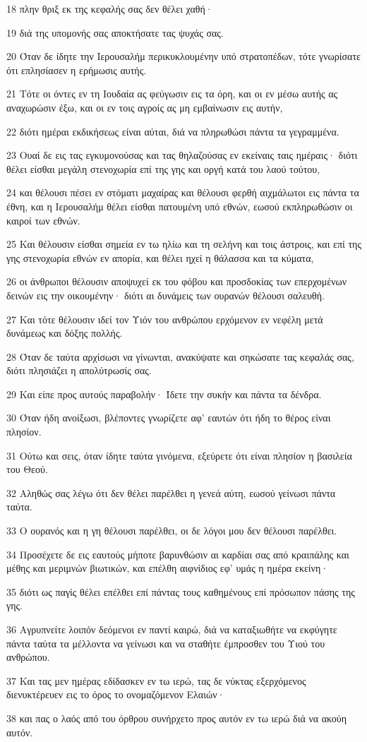 \par 18 πλην θριξ εκ της κεφαλής σας δεν θέλει χαθή·
\par 19 διά της υπομονής σας αποκτήσατε τας ψυχάς σας.
\par 20 Όταν δε ίδητε την Ιερουσαλήμ περικυκλουμένην υπό στρατοπέδων, τότε γνωρίσατε ότι επλησίασεν η ερήμωσις αυτής.
\par 21 Τότε οι όντες εν τη Ιουδαία ας φεύγωσιν εις τα όρη, και οι εν μέσω αυτής ας αναχωρώσιν έξω, και οι εν τοις αγροίς ας μη εμβαίνωσιν εις αυτήν,
\par 22 διότι ημέραι εκδικήσεως είναι αύται, διά να πληρωθώσι πάντα τα γεγραμμένα.
\par 23 Ουαί δε εις τας εγκυμονούσας και τας θηλαζούσας εν εκείναις ταις ημέραις· διότι θέλει είσθαι μεγάλη στενοχωρία επί της γης και οργή κατά του λαού τούτου,
\par 24 και θέλουσι πέσει εν στόματι μαχαίρας και θέλουσι φερθή αιχμάλωτοι εις πάντα τα έθνη, και η Ιερουσαλήμ θέλει είσθαι πατουμένη υπό εθνών, εωσού εκπληρωθώσιν οι καιροί των εθνών.
\par 25 Και θέλουσιν είσθαι σημεία εν τω ηλίω και τη σελήνη και τοις άστροις, και επί της γης στενοχωρία εθνών εν απορία, και θέλει ηχεί η θάλασσα και τα κύματα,
\par 26 οι άνθρωποι θέλουσιν αποψυχεί εκ του φόβου και προσδοκίας των επερχομένων δεινών εις την οικουμένην· διότι αι δυνάμεις των ουρανών θέλουσι σαλευθή.
\par 27 Και τότε θέλουσιν ιδεί τον Υιόν του ανθρώπου ερχόμενον εν νεφέλη μετά δυνάμεως και δόξης πολλής.
\par 28 Όταν δε ταύτα αρχίσωσι να γίνωνται, ανακύψατε και σηκώσατε τας κεφαλάς σας, διότι πλησιάζει η απολύτρωσίς σας.
\par 29 Και είπε προς αυτούς παραβολήν· Ίδετε την συκήν και πάντα τα δένδρα.
\par 30 Όταν ήδη ανοίξωσι, βλέποντες γνωρίζετε αφ' εαυτών ότι ήδη το θέρος είναι πλησίον.
\par 31 Ούτω και σεις, όταν ίδητε ταύτα γινόμενα, εξεύρετε ότι είναι πλησίον η βασιλεία του Θεού.
\par 32 Αληθώς σας λέγω ότι δεν θέλει παρέλθει η γενεά αύτη, εωσού γείνωσι πάντα ταύτα.
\par 33 Ο ουρανός και η γη θέλουσι παρέλθει, οι δε λόγοι μου δεν θέλουσι παρέλθει.
\par 34 Προσέχετε δε εις εαυτούς μήποτε βαρυνθώσιν αι καρδίαι σας από κραιπάλης και μέθης και μεριμνών βιωτικών, και επέλθη αιφνίδιος εφ' υμάς η ημέρα εκείνη·
\par 35 διότι ως παγίς θέλει επέλθει επί πάντας τους καθημένους επί πρόσωπον πάσης της γης.
\par 36 Αγρυπνείτε λοιπόν δεόμενοι εν παντί καιρώ, διά να καταξιωθήτε να εκφύγητε πάντα ταύτα τα μέλλοντα να γείνωσι και να σταθήτε έμπροσθεν του Υιού του ανθρώπου.
\par 37 Και τας μεν ημέρας εδίδασκεν εν τω ιερώ, τας δε νύκτας εξερχόμενος διενυκτέρευεν εις το όρος το ονομαζόμενον Ελαιών·
\par 38 και πας ο λαός από του όρθρου συνήρχετο προς αυτόν εν τω ιερώ διά να ακούη αυτόν.

